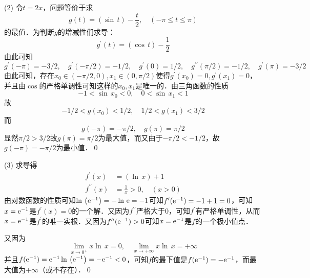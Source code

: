 (2) \solve 令$t = 2x$，问题等价于求
\begin{equation}
    g(t) = \left(\sin \, t\right) - \frac{t}{2}, \quad \left(-\pi \leq t \leq \pi\right)
\end{equation}
的最值．为判断$g$的增减性们求导：
\begin{equation}
    g^{\prime}(t) = \left(\cos \, t\right) - \frac{1}{2} 
\end{equation}
由此可知
\begin{equation}
g^{\prime}(-\pi) = -3/2, \quad g^{\prime}(-\pi/2) = -1/2, \quad g^{\prime}(0) = 1/2, \quad g^{\prime\prime}(\pi/2) = -1/2, \quad g^{\prime}(\pi) = -3/2
\end{equation}
由此可知，存在$x_0 \in (-\pi / 2, 0), x_1 \in (0, \pi / 2)$使得$g^{\prime}(x_0) = 0, g^{\prime}(x_1) = 0$，并且由$\cos$的严格单调性可知这样的$x_0, x_1$是唯一的．由三角函数的性质
\begin{equation}
-1 < \sin \, x_0 < 0, \quad 0 < \sin \, x_1 < 1
\end{equation}
故
\begin{equation}
-1/2 < g(x_0) < 1/2, \quad 1/2 < g(x_1) < 3/2
\end{equation}
而
\begin{equation}
    g(-\pi) = -\pi / 2, \quad g(\pi) = \pi / 2
\end{equation}
显然$\pi/2 > 3/2$故$g(\pi) = \pi/2$为最大值，而又由于$-\pi/2 < -1/2$，故$g(-\pi) = -\pi/2$为最小值．\qed\bigskip

(3) \solve 求导得
\begin{align}
    f^{\prime}(x) &= \left(\ln \, x\right) + 1 \\
    f^{\prime\prime}(x) &= \frac{1}{x} > 0, \quad (x > 0)
\end{align}
由对数函数的性质可知$\ln \, \left(\mathrm{e}^{-1}\right) = - \ln \, \mathrm{e} = -1$可知$f^{\prime}(\mathrm{e}^{-1}) = -1 + 1 = 0$，可知$x = \mathrm{e}^{-1}$是$f^{\prime}(x) = 0$的一个解．又因为$f^{\prime\prime}$严格大于$0$，可知$f^{\prime}$有严格单调性，从而$x=\mathrm{e}^{-1}$是$f^{\prime}$的唯一实根．又因为$f^{\prime\prime}(\mathrm{e}^{-1}) > 0$可知$x = \mathrm{e}^{-1}$是$f$的一个极小值点．

又因为
\begin{equation}
    \lim_{x \to 0^+} x \ln \, x = 0, \quad \lim_{x \to +\infty} x \ln \, x = +\infty
\end{equation}
并且$f(\mathrm{e}^{-1}) = \mathrm{e}^{-1} \ln \, \left(\mathrm{e}^{-1}\right) = -\mathrm{e}^{-1} < 0$，可知$f$的最下值是$f(\mathrm{e}^{-1}) = -\mathrm{e}^{-1}$，而最大值为$+\infty$（或不存在）．\qed\bigskip

